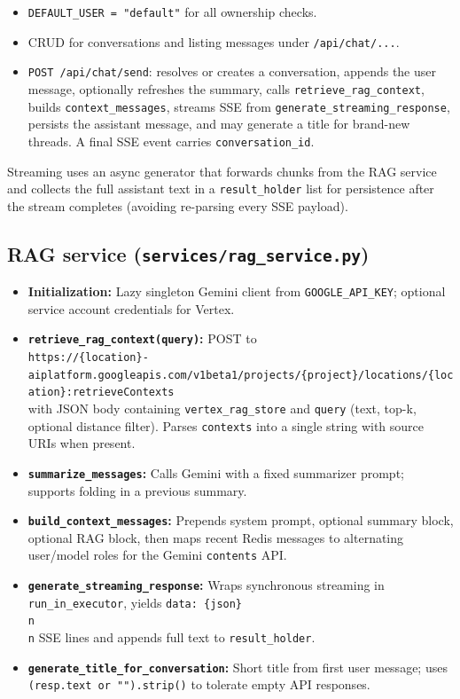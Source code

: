 \documentclass[11pt,a4paper]{article}
\begin{document}
\begin{itemize}[noitemsep]
  \item \texttt{DEFAULT\_USER = "default"} for all ownership checks.
  \item CRUD for conversations and listing messages under \texttt{/api/chat/...}.
  \item \texttt{POST /api/chat/send}: resolves or creates a conversation, appends the user message, optionally refreshes the summary, calls \texttt{retrieve\_rag\_context}, builds \texttt{context\_messages}, streams SSE from \texttt{generate\_streaming\_response}, persists the assistant message, and may generate a title for brand-new threads. A final SSE event carries \texttt{conversation\_id}.
\end{itemize}

Streaming uses an async generator that forwards chunks from the RAG service and collects the full assistant text in a \texttt{result\_holder} list for persistence after the stream completes (avoiding re-parsing every SSE payload).

\subsection{RAG service (\texttt{services/rag\_service.py})}

\begin{itemize}[noitemsep]
  \item \textbf{Initialization:} Lazy singleton Gemini client from \texttt{GOOGLE\_API\_KEY}; optional service account credentials for Vertex.
  \item \textbf{\texttt{retrieve\_rag\_context(query)}:} POST to\\
  \texttt{https://\{location\}-aiplatform.googleapis.com/v1beta1/projects/\{project\}/locations/\{location\}:retrieveContexts}\\
  with JSON body containing \texttt{vertex\_rag\_store} and \texttt{query} (text, top-k, optional distance filter). Parses \texttt{contexts} into a single string with source URIs when present.
  \item \textbf{\texttt{summarize\_messages}:} Calls Gemini with a fixed summarizer prompt; supports folding in a previous summary.
  \item \textbf{\texttt{build\_context\_messages}:} Prepends system prompt, optional summary block, optional RAG block, then maps recent Redis messages to alternating user/model roles for the Gemini \texttt{contents} API.
  \item \textbf{\texttt{generate\_streaming\_response}:} Wraps synchronous streaming in \texttt{run\_in\_executor}, yields \texttt{data: \{json\}\\n\\n} SSE lines and appends full text to \texttt{result\_holder}.
  \item \textbf{\texttt{generate\_title\_for\_conversation}:} Short title from first user message; uses \texttt{(resp.text or "").strip()} to tolerate empty API responses.
\end{itemize}
\end{document}
